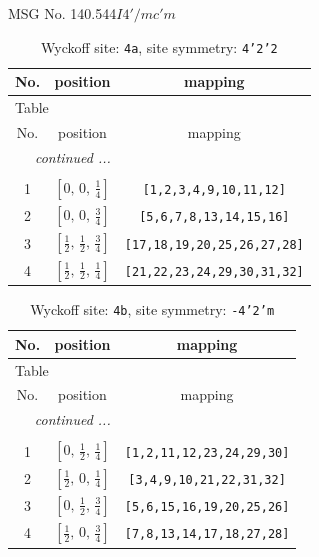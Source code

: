 \documentclass[fleqn,8pt]{jsarticle}
\begin{document}
\setcounter{MaxMatrixCols}{32}

\renewcommand{\tablename}{Table~}
\renewcommand{\figurename}{Figure~}
\begin{center}
\LARGE
MSG No. 140.544\quad$I4'/mc'm$
\end{center}
\renewcommand{\arraystretch}{1.2}
\begin{longtable}{ccc}
\caption{Wyckoff site: {\tt 4a}, site symmetry: {\tt 4'2'2}}
 \\
 \hline \hline
No. & position & mapping \\ \hline \endfirsthead

\multicolumn{2}{l}{\tablename\ \thetable{}} \\
 \hline \hline
No. & position & mapping \\ \hline \endhead

 \hline \hline
\multicolumn{2}{r}{\footnotesize\it continued ...} \\ \endfoot

 \hline \hline
\multicolumn{2}{r}{} \\ \endlastfoot

1 & $\left[ 0,\, 0,\, \frac{1}{4} \right]$ & {\tt [1,2,3,4,9,10,11,12]} \\ \hline
2 & $\left[ 0,\, 0,\, \frac{3}{4} \right]$ & {\tt [5,6,7,8,13,14,15,16]} \\ \hline
3 & $\left[ \frac{1}{2},\, \frac{1}{2},\, \frac{3}{4} \right]$ & {\tt [17,18,19,20,25,26,27,28]} \\ \hline
4 & $\left[ \frac{1}{2},\, \frac{1}{2},\, \frac{1}{4} \right]$ & {\tt [21,22,23,24,29,30,31,32]} \\
\end{longtable}
\renewcommand{\arraystretch}{1.2}
\begin{longtable}{ccc}
\caption{Wyckoff site: {\tt 4b}, site symmetry: {\tt -4'2'm}}
 \\
 \hline \hline
No. & position & mapping \\ \hline \endfirsthead

\multicolumn{2}{l}{\tablename\ \thetable{}} \\
 \hline \hline
No. & position & mapping \\ \hline \endhead

 \hline \hline
\multicolumn{2}{r}{\footnotesize\it continued ...} \\ \endfoot

 \hline \hline
\multicolumn{2}{r}{} \\ \endlastfoot

1 & $\left[ 0,\, \frac{1}{2},\, \frac{1}{4} \right]$ & {\tt [1,2,11,12,23,24,29,30]} \\ \hline
2 & $\left[ \frac{1}{2},\, 0,\, \frac{1}{4} \right]$ & {\tt [3,4,9,10,21,22,31,32]} \\ \hline
3 & $\left[ 0,\, \frac{1}{2},\, \frac{3}{4} \right]$ & {\tt [5,6,15,16,19,20,25,26]} \\ \hline
4 & $\left[ \frac{1}{2},\, 0,\, \frac{3}{4} \right]$ & {\tt [7,8,13,14,17,18,27,28]} \\
\end{longtable}
\end{document}
